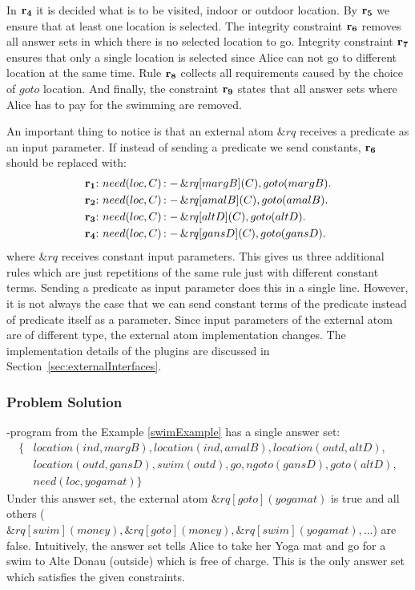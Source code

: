 \documentclass[a4paper, titlepage]{article}
\newcommand{\ext}[3]{\ensuremath{\&{\mathit{#1}}[#2](#3)}}
\DeclareMathOperator{\leftimpl}{:-}
\newcommand{\row}[1]{%
  \ensuremath{\color{black}\ensuremath{\mathbf{#1}} \color{black}}%
}
\newcommand{\rowprefix}[1]{%
  \ensuremath{\color{black}\mathbf{#1{:}}\ }%
}
\begin{document}
In $\row{r_4}$ it is decided what is to be visited, indoor or 
outdoor location. By $\row{r_5}$ we ensure that at least one location is selected. The integrity constraint $\row{r_6}$ removes all answer sets in which there is no selected location to go. Integrity constraint $\row{r_7}$ ensures that only a single location is selected since Alice can not go to different location at the same time. Rule $\row{r_8}$ collects all requirements caused by 
the choice of $\mathit{goto}$ location. And finally, the constraint $\row{r_9}$ states that all answer sets where 
Alice has to pay for the swimming are removed.

An important thing to notice is that an external atom 
$\mathit{\&rq}$ receives a predicate as an input parameter. If instead of sending a predicate we send 
constants, $\row{r_6}$ should be replaced with:
\begin{align*}
\rowprefix{r_1}& need(loc, C) \leftimpl \ext{rq}{margB}{C}, 
goto(margB).\\
\rowprefix{r_2}& need(loc, C) \leftimpl \ext{rq}{amalB}{C}, 
goto(amalB).\\
\rowprefix{r_3}& need(loc, C) \leftimpl \ext{rq}{altD}{C}, 
goto(altD).\\
\rowprefix{r_4}& need(loc, C) \leftimpl \ext{rq}{gansD}{C}, 
goto(gansD).
\end{align*}    
where $\&rq$ receives constant input parameters. This gives us three additional rules which are just 
repetitions of the same rule just with different constant 
terms. Sending a predicate as input parameter does this in a 
single line. However, it is not always the case that we can send constant terms of the predicate instead of predicate itself  as a parameter. Since input parameters of the external atom are of different type, the external atom implementation changes. The implementation details of the plugins are discussed in Section~\ref{sec:externalInterfaces}.

\subsubsection{Problem Solution}
\hex{}-program from the Example \ref{swimExample} has a 
single answer set:
\begin{align*}
\{ & 
location(ind,margB),location(ind,amalB),location(outd,altD), 
\\
& location(outd,gansD), 
swim(outd),go,ngoto(gansD),goto(altD),\\
& need(loc,yogamat) \} 
\end{align*}
Under this answer set, the external atom $\ext{rq}{goto}
{yogamat}$ is true and all others ($\ext{rq}{swim}
{money}, \ext{rq}{goto}{money}, \ext{rq}{swim}{yogamat}, 
\dots $) are false. Intuitively, the answer set tells Alice to 
take her Yoga mat and go for a swim to Alte Donau (outside) 
which is free of charge. This is the only answer set which 
satisfies the given constraints.    
\end{document}
